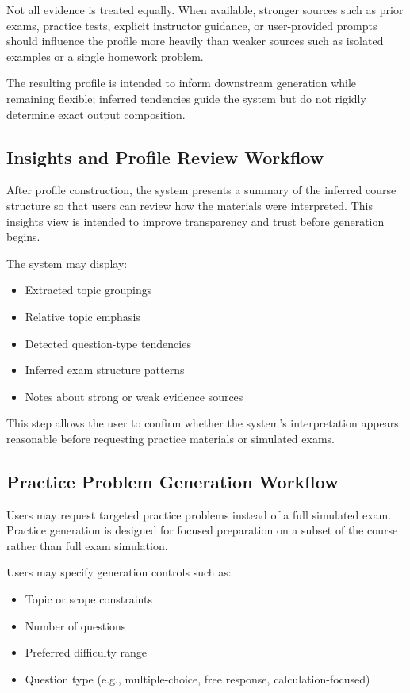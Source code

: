 \documentclass[11pt]{article}
\begin{document}
Not all evidence is treated equally. When available, stronger sources such as prior exams, practice tests, explicit instructor guidance, or user-provided prompts should influence the profile more heavily than weaker sources such as isolated examples or a single homework problem.

The resulting profile is intended to inform downstream generation while remaining flexible; inferred tendencies guide the system but do not rigidly determine exact output composition.

\subsection{Insights and Profile Review Workflow}
After profile construction, the system presents a summary of the inferred course structure so that users can review how the materials were interpreted. This insights view is intended to improve transparency and trust before generation begins.

The system may display:
\begin{itemize}
\item Extracted topic groupings
\item Relative topic emphasis
\item Detected question-type tendencies
\item Inferred exam structure patterns
\item Notes about strong or weak evidence sources
\end{itemize}

This step allows the user to confirm whether the system's interpretation appears reasonable before requesting practice materials or simulated exams.

\subsection{Practice Problem Generation Workflow}
Users may request targeted practice problems instead of a full simulated exam. Practice generation is designed for focused preparation on a subset of the course rather than full exam simulation.

Users may specify generation controls such as:
\begin{itemize}
\item Topic or scope constraints
\item Number of questions
\item Preferred difficulty range
\item Question type (e.g., multiple-choice, free response, calculation-focused)
\end{itemize}
\end{document}
